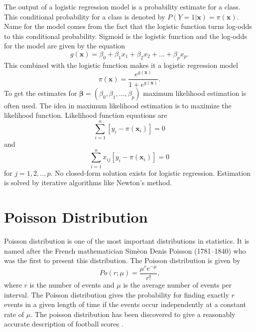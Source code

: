 The output of a logistic regression model is a probability estimate for a class. This conditional probability for a class is denoted by $P ( Y = 1 | \mathbf { x } ) = \pi ( \mathbf { x } )$. Name for the model comes from the fact that the logistic function turns log-odds to this conditional probability. Sigmoid is the logistic function and the log-odds for the model are given by the equation
\begin{equation}
    g ( \mathbf { x } ) = \beta _ { 0 } + \beta _ { 1 } x _ { 1 } + \beta _ { 2 } x _ { 2 } + \ldots + \beta _ { p } x _ { p }.
\end{equation}
This combined with the logistic function makes it a logistic regression model
\begin{equation}
    \pi ( \mathbf { x } ) = \frac { e ^ { g ( \mathbf { x } ) } } { 1 + e ^ { g ( \mathbf { x } ) } }.
\end{equation}
To get the estimates for $\boldsymbol { \beta } = \left( \beta _ { 0 } , \beta _ { 1 } , \ldots , \beta _ { p } \right)$ maximum likelihood estimation is often used. The idea in maximum likelihood estimation is to maximize the likelihood function. Likelihood function equations are
\begin{equation}
    \sum _ { i = 1 } ^ { n } \left[ y _ { i } - \pi \left( \mathbf { x } _ { i } \right) \right] = 0
\end{equation}
and
\begin{equation}
    \sum _ { i = 1 } ^ { n } x _ { i j } \left[ y _ { i } - \pi \left( \mathbf { x } _ { i } \right) \right] = 0
\end{equation}
for $j=1,2,..,p$. \cite{hosmer2013applied} No closed-form solution exists for logistic regression. Estimation is solved by iterative algorithms like Newton's method.

\section{Poisson Distribution}
Poisson distribution is one of the most important distributions in statistics. It is named after the French mathematician Simèon Denis Poisson (1781–1840) who was the first to present this distribution. The Poisson distribution is given by
\begin{equation}
    Po ( r ; \mu ) = \frac { \mu ^ { r } e ^ { - \mu } } { r ! } \text{,}
\end{equation}
where $r$ is the number of events and $\mu$ is the average number of events per interval. The Poisson distribution gives the probability for finding exactly $r$ events in a given length of time if the events occur independently at a constant rate of $\mu$. \cite{walck1996hand} The poisson distribution has been discovered to give a reasonably accurate description of football scores \cite{maher1982modelling}.

